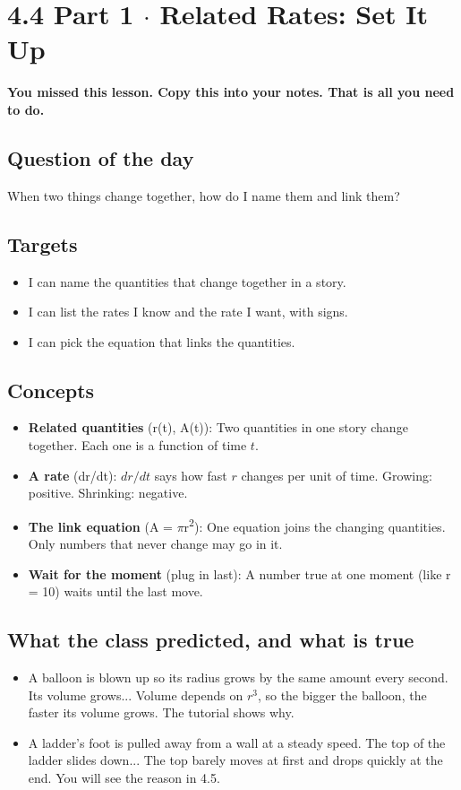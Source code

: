 \documentclass[11pt]{article}
\begin{document}
\section*{4.4 Part 1 $\cdot$ Related Rates: Set It Up}
\textbf{You missed this lesson. Copy this into your notes. That is all you need to do.}\par\medskip
\subsection*{Question of the day}
When two things change together, how do I name them and link them?\par
\subsection*{Targets}\begin{itemize}\item I can name the quantities that change together in a story.
\item I can list the rates I know and the rate I want, with signs.
\item I can pick the equation that links the quantities.\end{itemize}
\subsection*{Concepts}\begin{itemize}
\item \textbf{Related quantities} (r(t), A(t)): Two quantities in one story change together. Each one is a function of time $t$.
\item \textbf{A rate} (dr/dt): $dr/dt$ says how fast $r$ changes per unit of time. Growing: positive. Shrinking: negative.
\item \textbf{The link equation} (A = $\pi$r\textsuperscript{2}): One equation joins the changing quantities. Only numbers that never change may go in it.
\item \textbf{Wait for the moment} (plug in last): A number true at one moment (like r = 10) waits until the last move.
\end{itemize}
\subsection*{What the class predicted, and what is true}\begin{itemize}
\item A balloon is blown up so its radius grows by the same amount every second. Its volume grows...  Volume depends on $r^3$, so the bigger the balloon, the faster its volume grows. The tutorial shows why.
\item A ladder's foot is pulled away from a wall at a steady speed. The top of the ladder slides down...  The top barely moves at first and drops quickly at the end. You will see the reason in 4.5.
\end{itemize}
\end{document}
